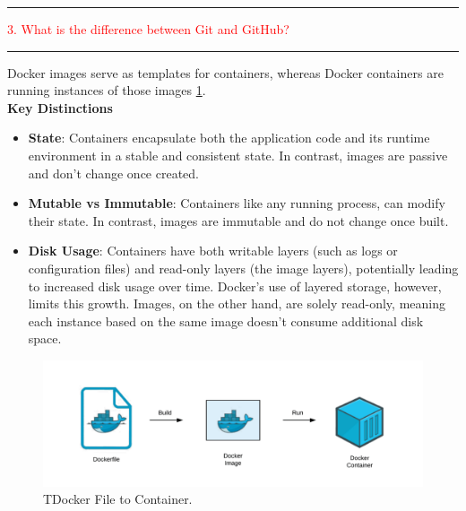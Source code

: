 \documentclass{article}
\begin{document}
\noindent
{\color{red} \rule{\linewidth}{0.5mm}}
\textcolor{red}{3. What is the difference between Git and GitHub?} \\
\noindent
{\color{red} \rule{\linewidth}{0.5mm}}
Docker images serve as templates for containers, whereas Docker containers are running instances of those images \ref{fig:Docker1}.  \\
\textbf{Key Distinctions}
\begin{itemize}
\color{blue}
\item \textbf{State}: Containers encapsulate both the application code and its runtime environment in a stable and consistent state. In contrast, images are passive and don't change once created.
\item \textbf{Mutable vs Immutable}: Containers like any running process, can modify their state. In contrast, images are immutable and do not change once built.
\item \textbf{Disk Usage}: Containers have both writable layers (such as logs or configuration files) and read-only layers (the image layers), potentially leading to increased disk usage over time. Docker's use of layered storage, however, limits this growth. Images, on the other hand, are solely read-only, meaning each instance based on the same image doesn't consume additional disk space. 
\end{itemize}



\begin{figure}
\centering
\includegraphics[width=0.95\linewidth]{Docker1.jpg}
\caption{\label{fig:Docker1}TDocker File to Container.}
\end{figure}
\end{document}
